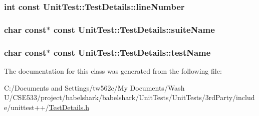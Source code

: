 \hypertarget{class_unit_test_1_1_test_details_a55e2a9270e7b3b4da8169761376ee0c}{
\subsubsection[{lineNumber}]{\setlength{\rightskip}{0pt plus 5cm}int const {\bf UnitTest::TestDetails::lineNumber}}}
\label{class_unit_test_1_1_test_details_a55e2a9270e7b3b4da8169761376ee0c}


\hypertarget{class_unit_test_1_1_test_details_4ab111817a7c2e627b77ecfc91e1bcf0}{
\subsubsection[{suiteName}]{\setlength{\rightskip}{0pt plus 5cm}char const$\ast$ const {\bf UnitTest::TestDetails::suiteName}}}
\label{class_unit_test_1_1_test_details_4ab111817a7c2e627b77ecfc91e1bcf0}


\hypertarget{class_unit_test_1_1_test_details_88446b0c9bf84e3cb7d33b6584c9077a}{
\subsubsection[{testName}]{\setlength{\rightskip}{0pt plus 5cm}char const$\ast$ const {\bf UnitTest::TestDetails::testName}}}
\label{class_unit_test_1_1_test_details_88446b0c9bf84e3cb7d33b6584c9077a}




The documentation for this class was generated from the following file:\begin{CompactItemize}
\item 
C:/Documents and Settings/tw562c/My Documents/Wash U/CSE533/project/babelshark/babelshark/UnitTests/UnitTests/3rdParty/include/unittest++/\hyperlink{_test_details_8h}{TestDetails.h}\end{CompactItemize}
